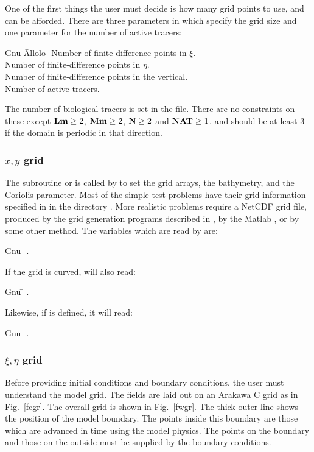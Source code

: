 One of the first things the user must decide is how many grid points
to use, and can be afforded.  There are three parameters in
 which specify the grid size and one parameter for the
number of active tracers:
\begin{tabbing}
  Gnu \= Allolo \= \kill
  \>  \> Number of finite-difference points in $\xi$. \\
  \>  \> Number of finite-difference points in $\eta$. \\
  \>  \> Number of finite-difference points in the vertical. \\
  \>  \> Number of active tracers. \\
\end{tabbing}
The number of biological tracers is set in the  file.
There are no constraints on these except $\mbox{\bf Lm} \geq 2$, $\mbox{\bf Mm}
\geq 2$, $\mbox{\bf N} \geq 2$ and $\mbox{\bf NAT} \geq 1$.   and
 should be at least 3 if the domain is periodic in that
direction.

\subsubsection{$x,y$ grid}
The subroutine  or  is called by
 to set the grid arrays, the bathymetry, and the
Coriolis parameter.  Most of the simple test problems have their grid
information specified in  in the directory
.  More realistic problems require a NetCDF grid
file, produced by the grid generation programs described in
\citet{GRIDS}, by the Matlab , or by some
other method.  The variables which are read by  are:
\begin{tabbing}
  Gnu \= \kill
  \> .
\end{tabbing}
If the grid is curved,  will also read:
\begin{tabbing}
  Gnu \= \kill
  \> .
\end{tabbing}
Likewise, if  is defined, it will read:
\begin{tabbing}
  Gnu \= \kill
  \> .
\end{tabbing}

\subsubsection {$\xi,\eta$ grid}
Before providing initial conditions and boundary conditions, the
user must understand the model grid. The fields are laid out on an
Arakawa C grid as in Fig.\ \ref{fcgr}. The overall grid is shown in
Fig.\ \ref{fwgr}.  The thick outer line shows the position of the
model boundary. The points inside this boundary are those which are
advanced in time using the model physics. The points on the boundary
and those on the outside must be supplied by the boundary
conditions.

